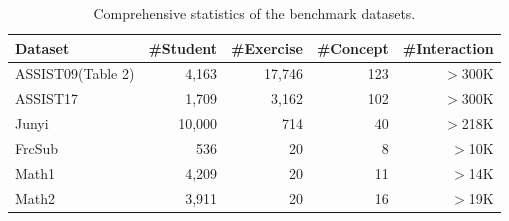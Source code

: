 \documentclass[runningheads]{llncs}
\begin{document}


\begin{table}[h]
\centering
\caption{Comprehensive statistics of the benchmark datasets.}
\label{tab:datasets}
\setlength{\tabcolsep}{6pt}
\renewcommand\arraystretch{0.9}
\begin{tabular}{@{}l|rrrr@{}}
\toprule
\textbf{Dataset} & \#\textbf{Student} & \#\textbf{Exercise} & \#\textbf{Concept} & \#\textbf{Interaction} \\ \midrule
ASSIST09(Table 2)         & 4,163             & 17,746             & 123               & $>$300K               \\
ASSIST17         & 1,709             & 3,162              & 102               & $>$300K               \\
Junyi            & 10,000            & 714                & 40                & $>$218K                  \\
FrcSub           & 536               & 20                 & 8                 & $>$10K                \\
Math1            & 4,209               & 20                 & 11                & $>$14K                 \\
Math2            & 3,911               & 20                 & 16                & $>$19K                 \\ \bottomrule
\end{tabular}
\end{table}
\end{document}
